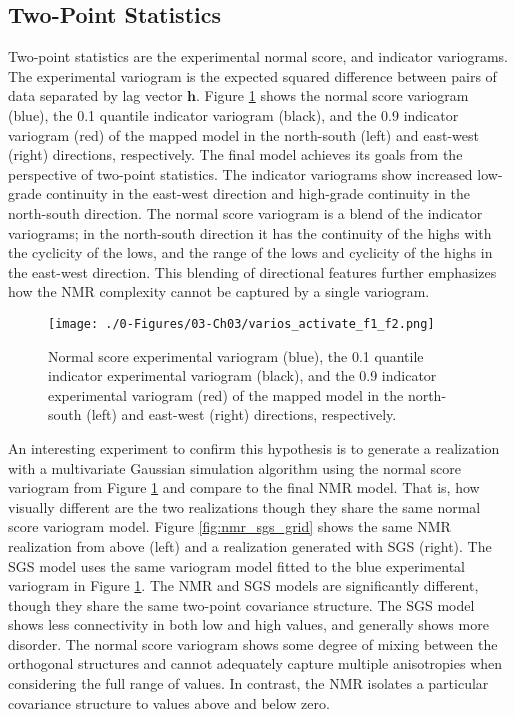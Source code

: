 \FloatBarrier
\subsection{Two-Point Statistics}
\label{subsec:03twopt}

Two-point statistics are the experimental normal score, and indicator variograms. The experimental variogram is the expected squared difference between pairs of data separated by lag vector $\mathbf{h}$. Figure \ref{fig:varios_activate_f1_f2} shows the normal score variogram (blue), the 0.1 quantile indicator variogram (black), and the 0.9 indicator variogram (red) of the mapped model in the north-south (left) and east-west (right) directions, respectively. The final model achieves its goals from the perspective of two-point statistics. The indicator variograms show increased low-grade continuity in the east-west direction and high-grade continuity in the north-south direction. The normal score variogram is a blend of the indicator variograms; in the north-south direction it has the continuity of the highs with the cyclicity of the lows, and the range of the lows and cyclicity of the highs in the east-west direction. This blending of directional features further emphasizes how the \gls{NMR} complexity cannot be captured by a single variogram.

\begin{figure}[htb!]
    \centering
    \texttt{[image: ./0-Figures/03-Ch03/varios\_activate\_f1\_f2.png]}
    \caption{Normal score experimental variogram (blue), the 0.1 quantile indicator experimental variogram (black), and the 0.9 indicator experimental variogram (red) of the mapped model in the north-south (left) and east-west (right) directions, respectively.}
    \label{fig:varios_activate_f1_f2}
\end{figure}

An interesting experiment to confirm this hypothesis is to generate a realization with a multivariate Gaussian simulation algorithm using the normal score variogram from Figure \ref{fig:varios_activate_f1_f2} and compare to the final \gls{NMR} model. That is, how visually different are the two realizations though they share the same normal score variogram model. Figure \ref{fig:nmr_sgs_grid} shows the same \gls{NMR} realization from above (left) and a realization generated with \gls{SGS} (right). The \gls{SGS} model uses the same variogram model fitted to the blue experimental variogram in Figure \ref{fig:varios_activate_f1_f2}. The \gls{NMR} and \gls{SGS} models are significantly different, though they share the same two-point covariance structure. The \gls{SGS} model shows less connectivity in both low and high values, and generally shows more disorder. The normal score variogram shows some degree of mixing between the orthogonal structures and cannot adequately capture multiple anisotropies when considering the full range of values. In contrast, the \gls{NMR} isolates a particular covariance structure to values above and below zero.

